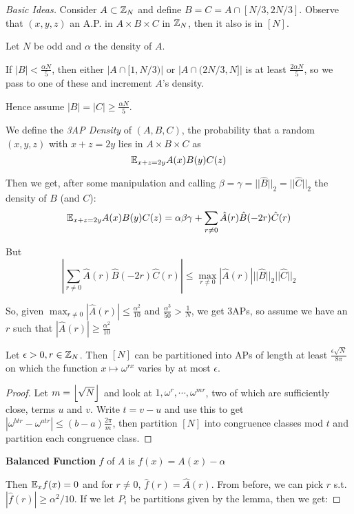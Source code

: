\documentclass[a4paper]{article}
\begin{document}
{\begin{proof}[Basic Ideas]
	Consider $A\subset\mathbb{Z}_N$ and define $B=C=A\cap[N/3, 2N/3]$. Observe that $(x,y,z)$ an A.P. in $A\times B\times C$ in $\mathbb{Z}_N$, then it also is in $[N]$.
	
	Let $N$ be odd and $\alpha$ the density of $A$.
	
	If $|B|<\frac{\alpha N}{5}$, then either $\left|A\cap[1, N/3)\right|$ or $\left|A\cap(2N/3, N]\right|$ is at least $\frac{2\alpha N}{5}$, so we pass to one of these and increment $A$'s density.
	
	Hence assume $|B|=|C|\geq\frac{\alpha N}{5}$.
	
	We define the \emph{3AP Density} of $(A,B,C)$, the probability that a random $(x,y,z)$ with $x+z=2y$ lies in $A\times B\times C$ as $$\mathbb{E}_{x+z=2y}A(x)B(y)C(z)$$
	
	Then we get, after some manipulation and calling $\beta=\gamma=||\hat{B}||_2=||\hat{C}||_2$ the density of $B$ (and $C$):
	$$\mathbb{E}_{x+z=2y}A(x)B(y)C(z)=\alpha\beta\gamma + \sum_{r\neq0}\hat{A}(r)\hat{B}(-2r)\hat{C}(r)$$
	
	But 
	$$\left|\sum_{r\neq0}\hat{A}(r)\hat{B}(-2r)\hat{C}(r)\right|\leq\max_{r\neq0}\left|\hat{A}(r)\right|||\hat{B}||_2||\hat{C}||_2$$
	
	So, given $\max_{r\neq0}\left|\hat{A}(r)\right|\leq\frac{\alpha^2}{10}$ and $\frac{\alpha^3}{50}>\frac{1}{N}$, we get 3APs, so assume we have an $r$ such that $\left|\hat{A}(r)\right|\geq\frac{\alpha^2}{10}$
	
	\begin{lemma}
		Let $\epsilon>0, r\in\mathbb{Z}_N$. Then $[N]$ can be partitioned into APs of length at least $\frac{\epsilon\sqrt{N}}{8\pi}$ on which the function $x\mapsto\omega^{rx}$ varies by at most $\epsilon$.
	\end{lemma}
	\begin{proof}
	Let $m=\left\lfloor \sqrt{N} \right\rfloor$ and look at $1,\omega^{r},\cdots,\omega^{mr}$, two of which are sufficiently close, terms $u$ and $v$. Write $t=v-u$ and use this to get $\left|\omega^{btr}-\omega^{atr}\right|\leq(b-a)\frac{2\pi}{m}$, then partition $[N]$ into congruence classes mod $t$ and partition each congruence class.
	\end{proof}
	
	\begin{defi}
	\textbf{Balanced Function} $f$ of $A$ is $f(x)=A(x)-\alpha$
	\end{defi}
	
	Then $\mathbb{E}_xf(x)=0$ and for $r\neq0$, $\hat{f}(r)=\hat{A}(r)$. From before, we can pick $r$ s.t. $|\hat{f}(r)| \geq \alpha^2/10$. If we let $P_i$ be partitions given by the lemma, then we get:
	

\end{proof}}
\end{document}
